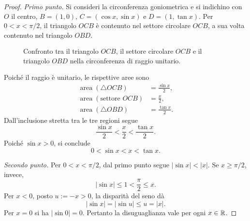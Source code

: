 \begin{proof}
\emph{Primo punto.}
Si consideri la circonferenza goniometrica e si indichino
con \(O\) il centro, \(B=(1,0)\), \(C=(\cos x,\sin x)\)
e \(D=(1,\tan x)\). Per \(0<x<\pi/2\), il triangolo
\(OCB\) è contenuto nel settore circolare \(OCB\),
a sua volta contenuto nel triangolo \(OBD\).

\begin{figure}[htbp]
  \centering
  \caption{Confronto tra il triangolo \(OCB\), il settore
  circolare \(OCB\) e il triangolo \(OBD\) nella
  circonferenza di raggio unitario.}
  \label{fig:lez20-confronto-aree}
\end{figure}

Poiché il raggio è unitario, le rispettive aree sono
\[
\begin{aligned}
  \operatorname{area}(\triangle OCB)&=\frac{\sin x}{2},\\
  \operatorname{area}(\text{settore }OCB)&=\frac{x}{2},\\
  \operatorname{area}(\triangle OBD)&=\frac{\tan x}{2}.
\end{aligned}
\]
Dall'inclusione stretta tra le tre regioni segue
\[
  \frac{\sin x}{2}<\frac{x}{2}<\frac{\tan x}{2}.
\]
Poiché \(\sin x>0\), si conclude
\[
  0<\sin x<x<\tan x.
\]

\emph{Secondo punto.}
Per \(0<x<\pi/2\), dal primo punto segue
\(|\sin x|<|x|\). Se \(x\ge\pi/2\), invece,
\[
  |\sin x|\le1<\frac\pi2\le x.
\]
Per \(x<0\), posto \(u:=-x>0\),
la disparità del seno dà
\[
  |\sin x|=|\sin u|\le u=|x|.
\]
Per \(x=0\) si ha \(|\sin0|=0\).
Pertanto la disuguaglianza vale per ogni \(x\in\mathbb{R}\).
\end{proof}

